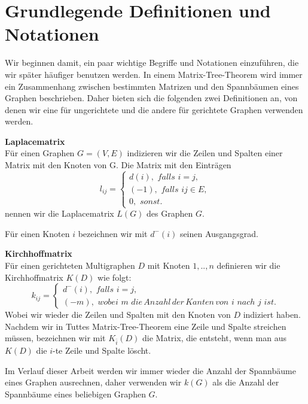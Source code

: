 \section{Grundlegende Definitionen und Notationen}
Wir beginnen damit, ein paar wichtige Begriffe und Notationen einzuführen, die wir später häufiger benutzen werden.
In einem Matrix-Tree-Theorem wird immer ein Zusammenhang zwischen bestimmten Matrizen und den Spannbäumen eines Graphen beschrieben. Daher bieten sich die folgenden zwei Definitionen an, von denen wir eine für ungerichtete und die andere für gerichtete Graphen verwenden werden.
\begin{Df}\textbf{Laplacematrix}\\
Für einen Graphen $G=(V,E)$ indizieren wir die Zeilen und Spalten einer Matrix mit den Knoten von G. Die Matrix mit den Einträgen
$$
l_{ij}=
\begin{cases}
 d(i),\, \, falls\,\, i=j,\\
 (-1), \, \, falls \,\, ij \in E,\\
 0, \,\, sonst.
\end{cases}
$$
nennen wir die Laplacematrix $L(G)$ des Graphen $G$.
\end{Df}
Für einen Knoten $i$ bezeichnen wir mit $d^{-}(i)$ seinen Ausgangsgrad.
\begin{Df}\textbf{Kirchhoffmatrix}\\
 Für einen gerichteten Multigraphen $D$ mit Knoten $1,..,n$ definieren wir die Kirchhoffmatrix $K(D)$ wie folgt:\\
 $$
k_{ij}=
\begin{cases}
 d^{-}(i),\, \, falls\,\, i=j,\\
 (-m), \, \, wobei \,\, m \,\, die\, Anzahl\, der\, Kanten\, von\,\, i\,\, nach \,\,j\,\, ist.
\end{cases}
$$
Wobei wir wieder die Zeilen und Spalten mit den Knoten von $D$ indiziert haben.\\
Nachdem wir in Tuttes Matrix-Tree-Theorem eine Zeile und Spalte streichen müssen, bezeichnen wir mit $K_{\bar{i}}(D)$ die Matrix, die entsteht, wenn man aus $K(D)$ die $i$-te Zeile und Spalte löscht.
\end{Df}
Im Verlauf dieser Arbeit werden wir immer wieder die Anzahl der Spannbäume eines Graphen ausrechnen, daher verwenden wir $\mathit{k}(G)$ als die Anzahl der Spannbäume eines beliebigen Graphen $G$.
